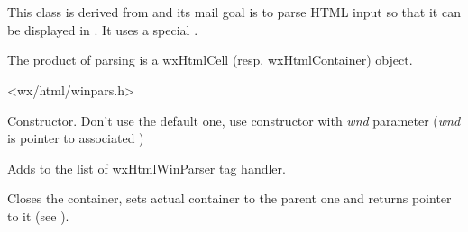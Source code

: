 %
%

\section{}\label{wxhtmlwinparser}

This class is derived from  and
its mail goal is to parse HTML input so that it can be displayed in
. It uses a special 
.


The product of parsing is a wxHtmlCell (resp. wxHtmlContainer) object.




<wx/html/winpars.h>




\label{wxhtmlwinparserwxhtmlwinparser}



Constructor. Don't use the default one, use constructor with
{\it wnd} parameter ({\it wnd} is pointer to associated )

\label{wxhtmlwinparseraddmodule}


Adds  to the list of wxHtmlWinParser tag handler.

\label{wxhtmlwinparserclosecontainer}


Closes the container, sets actual container to the parent one
and returns pointer to it (see ).

\label{wxhtmlwinparsercreatecurrentfont}

